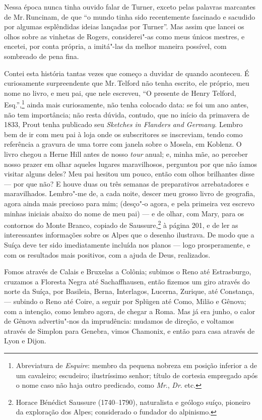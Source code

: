 Nessa época nunca tinha ouvido falar de Turner, exceto pelas palavras
marcantes de Mr.\,Runcinam, de que ``o mundo tinha sido recentemente
fascinado e sacudido por algumas esplêndidas ideias lançadas por
Turner''. Mas assim que lancei os olhos sobre as vinhetas de Rogers, \label{87}
considerei"-as como meus únicos mestres, e encetei, por conta própria, a
imitá"-las da melhor maneira possível, com sombreado de pena fina.

Contei esta história tantas vezes que começo a duvidar de quando
aconteceu. É curiosamente surpreendente que Mr.\,Telford não tenha
escrito, ele próprio, meu nome no livro, e meu pai, que nele escreveu,
``O presente de Henry Telford, Esq.'',\footnote{Abreviatura de
  \textit{Esquire}: membro da pequena nobreza em posição inferior a de um
  cavaleiro; escudeiro; ilustríssimo senhor; título de cortesia
  empregado após o nome caso não haja outro predicado, como \textit{Mr}., \textit{Dr}. etc.} ainda mais curiosamente, não tenha colocado data:
se foi um ano antes, não tem importância; não resta dúvida, contudo, que
no início da primavera de 1833, Prout tenha publicado seu \textit{Sketches
in Flanders and Germany}. Lembro bem de ir com meu pai à loja onde os
subscritores se inscreviam, tendo como referência a gravura de uma torre
com janela sobre o Mosela, em Koblenz. O livro chegou a Herne Hill antes
de nosso \textit{tour} anual; e, minha mãe, ao perceber nosso prazer em
olhar aqueles lugares maravilhosos, perguntou por que não íamos visitar
alguns deles? Meu pai hesitou um pouco, então com olhos brilhantes disse
--- por que não? E houve duas ou três semanas de preparativos
arrebatadores e maravilhados. Lembro"-me de, a cada noite, descer meu
grosso livro de geografia, agora ainda mais precioso para mim; (desço"-o
agora, e pela primeira vez escrevo minhas iniciais abaixo do nome de meu
pai) --- e de olhar, com Mary, para os contornos do Monte Branco, copiado
de Saussure,\footnote{Horace Bénédict Saussure (1740--1790), naturalista e
  geólogo suíço, pioneiro da exploração dos Alpes; considerado o
  fundador do alpinismo.} à página 201, e de ler as
interessantes informações sobre os Alpes que o desenho ilustrava. De
modo que a Suíça deve ter sido imediatamente incluída nos planos --- logo
prosperamente, e com os resultados mais positivos, com a ajuda de Deus,
realizados.

Fomos através de Calais e Bruxelas a Colônia; subimos o Reno até
Estrasburgo, cruzamos a Floresta Negra até Sachaffhausen, então fizemos
um giro através do norte da Suíça, por Basileia, Berna, Interlagos,
Lucerna, Zurique, até Constança, --- subindo o Reno até Coire, a seguir
por Splügen até Como, Milão e Gênova; com a intenção, como lembro agora,
de chegar a Roma. Mas já era junho, o calor de Gênova advertiu"-nos da
imprudência: mudamos de direção, e voltamos através de Simplon para
Genebra, vimos Chamonix, e então para casa através de Lyon e Dijon.

